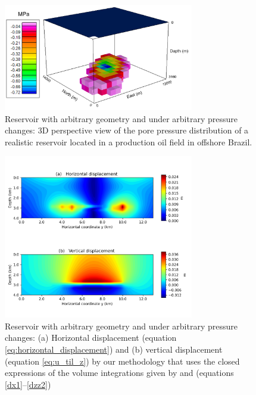 \documentclass[journal abbreviation, manuscript]{copernicus}
\begin{document}


\begin{figure}[ht]
\includegraphics[width=8.3cm]{Fig/Figure_Pressure_complex_reservoir.png}
\caption{Reservoir with arbitrary geometry and under arbitrary pressure changes: 3D perspective view of the pore pressure distribution of a realistic reservoir 
located in a production oil field in offshore Brazil.}
\label{fig:pressure_complex_reservoir}
\end{figure}

\begin{figure}[ht]
\includegraphics[width=8.3cm]{Fig/Figure_Displacement_complex_reservoir.png}
\caption{Reservoir with arbitrary geometry and under arbitrary pressure changes: (a) Horizontal displacement (equation \ref{eq:horizontal_displacement}) and (b) vertical displacement (equation \ref{eq:u_til_z}) by our methodology that uses the closed expressions of the volume integrations given by \cite{Nagyetal2000} and \cite{Nagyetal2002} (equations \ref{dx1}--\ref{dzz2})}
\label{fig:displacement_complex_reservoir}
\end{figure}
\end{document}
